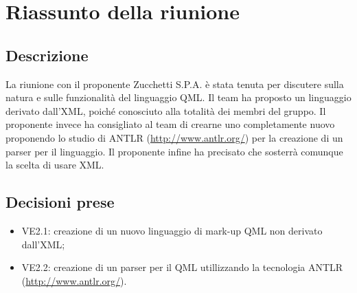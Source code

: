 \section{Riassunto della riunione}
\subsection{Descrizione}

La riunione con il proponente Zucchetti S.P.A. è stata tenuta per discutere sulla natura e sulle funzionalità del linguaggio QML. Il team ha proposto un linguaggio derivato dall'XML, poiché conosciuto alla totalità dei membri del gruppo. Il proponente invece ha consigliato al team di crearne uno completamente nuovo proponendo lo studio di ANTLR (\url{http://www.antlr.org/}) per la creazione di un parser per il linguaggio. Il proponente infine ha precisato che sosterrà comunque la scelta di usare XML.

\subsection{Decisioni prese}
\begin{itemize}
	\item VE2.1: creazione di un nuovo linguaggio di mark-up QML non derivato dall'XML;
	\item VE2.2: creazione di un parser per il QML utillizzando la tecnologia ANTLR (\url{http://www.antlr.org/}).
\end{itemize}
